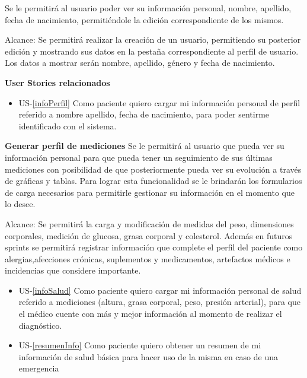 Se le permitirá al usuario poder ver su información personal, nombre, apellido, fecha de nacimiento, permitiéndole la edición correspondiente de los mismos.

Alcance: Se permitirá realizar la creación de un usuario, permitiendo su posterior edición y mostrando sus datos en la pestaña correspondiente al perfil de usuario. Los datos a mostrar serán nombre, apellido, género y fecha de nacimiento.

		\textbf{User Stories relacionados}
        
		\begin{itemize}
			\item US-\ref{infoPerfil} Como paciente quiero cargar mi información personal de perfil referido a nombre apellido, fecha de nacimiento,  para poder sentirme identificado con el sistema.           	
		\end{itemize}


\textbf{Generar perfil de mediciones}
Se le permitirá al usuario que pueda ver su información personal para que pueda tener un seguimiento de sus últimas mediciones con posibilidad de que posteriormente pueda ver su evolución a través de gráficas y tablas.
Para lograr esta funcionalidad se le brindarán los formularios de carga necesarios para permitirle gestionar su información en el momento que lo desee.


Alcance: Se permitirá la carga y modificación de medidas del peso, dimensiones corporales, medición de glucosa, grasa corporal y colesterol.
Además en futuros sprints se permitirá registrar información que complete el perfil del paciente como alergias,afecciones crónicas, suplementos y medicamentos, artefactos médicos e incidencias que considere importante.

		\begin{itemize}
			\item  US-\ref{infoSalud} Como paciente quiero cargar mi información personal de salud referido a mediciones (altura, grasa corporal, peso, presión arterial), para que el médico cuente con más y mejor información al momento de realizar el diagnóstico.
            \item US-\ref{resumenInfo}  Como paciente quiero obtener un resumen de mi información de salud básica para hacer uso de la misma en caso de una emergencia
		\end{itemize}

